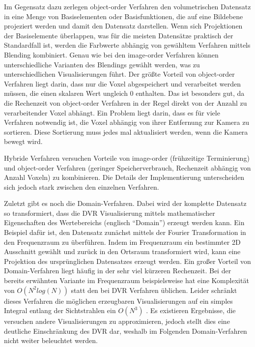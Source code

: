 \documentclass[a4paper,fontsize=12pt,toc=bib,halfparskip,ngerman]{scrartcl}
\begin{document}
Im Gegensatz dazu zerlegen object-order Verfahren den volumetrischen Datensatz in eine Menge von Basiselementen oder Basisfunktionen, die auf eine Bildebene projeziert werden und damit den Datensatz darstellen. Wenn sich Projektionen der Basiselemente \"uberlappen, was f\"ur die meisten Datens\"atze praktisch der Standardfall ist, werden die Farbwerte abh\"angig von gew\"ahltem Verfahren mittels Blending kombiniert. Genau wie bei den image-order Verfahren k\"onnen unterschiedliche Varianten des Blendings gew\"ahlt werden, was zu unterschiedlichen Visualisierungen f\"uhrt. Der gr\"o{\ss}te Vorteil von object-order Verfahren liegt darin, dass nur die Voxel abgespeichert und verarbeitet werden m\"ussen, die einen skalaren Wert ungleich 0 enthalten. Das ist besonders gut, da die Rechenzeit von object-order Verfahren in der Regel direkt von der Anzahl zu verarbeitender Voxel abh\"angt. Ein Problem liegt darin, dass es f\"ur viele Verfahren notwendig ist, die Voxel abh\"angig von ihrer Entfernung zur Kamera zu sortieren. Diese Sortierung muss jedes mal aktualisiert werden, wenn die Kamera bewegt wird.

Hybride Verfahren versuchen Vorteile von image-order (fr\"uhzeitige Terminierung) und object-order Verfahren (geringer Speicherverbrauch, Rechenzeit abh\"angig von Anzahl Voxeln) zu kombinieren. Die Details der Implementierung unterscheiden sich jedoch stark zwischen den einzelnen Verfahren. 

Zuletzt gibt es noch die Domain-Verfahren. Dabei wird der komplette Datensatz so transformiert, dass die DVR Visualisierung mittels mathematischer Eigenschaften des Wertebereichs (englisch ``Domain'') erzeugt werden kann. Ein Beispiel daf\"ur ist, den Datensatz zun\"achst mittels der Fourier Transformation in den Frequenzraum zu \"uberf\"uhren. Indem im Frequenzraum ein bestimmter 2D Ausschnitt gew\"ahlt und zur\"uck in den Ortsraum transformiert wird, kann eine Projektion des urspr\"unglichen Datensatzes erzeugt werden. Ein gro{\ss}er Vorteil von Domain-Verfahren liegt h\"aufig in der sehr viel k\"urzeren Rechenzeit. Bei der bereits erw\"ahnten Variante im Frequenzraum beispielsweise hat eine Komplexit\"at von $O(N^2 log(N))$ statt den bei DVR Verfahren \"ublichen. Leider schr\"ankt dieses Verfahren die m\"oglichen erzeugbaren Visualisierungen auf ein simples Integral entlang der Sichtstrahlen ein $O(N^3)$ \cite[S.~143]{hansen2005visualization}. Es existieren Ergebnisse, die versuchen andere Visualisierungen zu approximieren, jedoch stellt dies eine deutliche Einschr\"ankung des DVR dar, weshalb im Folgenden Domain-Verfahren nicht weiter beleuchtet werden.
\end{document}
